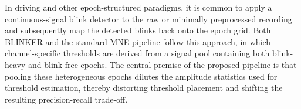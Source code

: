 In driving and other epoch-structured paradigms, it is common to apply a continuous-signal blink detector to the raw or minimally preprocessed recording and subsequently map the detected blinks back onto the epoch grid. Both BLINKER and the standard MNE pipeline follow this approach, in which channel-specific thresholds are derived from a signal pool containing both blink-heavy and blink-free epochs. The central premise of the proposed pipeline is that pooling these heterogeneous epochs dilutes the amplitude statistics used for threshold estimation, thereby distorting threshold placement and shifting the resulting precision-recall trade-off.

